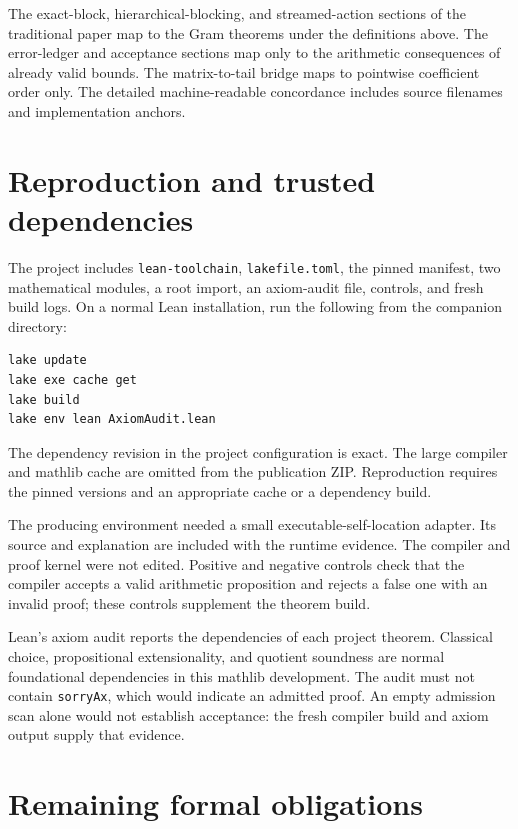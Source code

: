 \documentclass[11pt]{article}
\newcommand{\decl}[1]{\nolinkurl{#1}}
\begin{document}
The exact-block, hierarchical-blocking, and streamed-action sections of the
traditional paper map to the Gram theorems under the definitions above. The
error-ledger and acceptance sections map only to the arithmetic consequences
of already valid bounds. The matrix-to-tail bridge maps to pointwise
coefficient order only. The detailed machine-readable concordance includes
source filenames and implementation anchors.

\section{Reproduction and trusted dependencies}

The project includes \decl{lean-toolchain}, \decl{lakefile.toml}, the pinned
manifest, two mathematical modules, a root import, an axiom-audit file,
controls, and fresh build logs. On a normal Lean installation, run the
following from the companion directory:
\begin{verbatim}
lake update
lake exe cache get
lake build
lake env lean AxiomAudit.lean
\end{verbatim}
The dependency revision in the project configuration is exact. The large
compiler and mathlib cache are omitted from the publication ZIP. Reproduction
requires the pinned versions and an appropriate cache or a dependency build.

The producing environment needed a small executable-self-location adapter.
Its source and explanation are included with the runtime evidence. The
compiler and proof kernel were not edited. Positive and negative controls
check that the compiler accepts a valid arithmetic proposition and rejects a
false one with an invalid proof; these controls supplement the theorem build.

Lean's axiom audit reports the dependencies of each project theorem. Classical
choice, propositional extensionality, and quotient soundness are normal
foundational dependencies in this mathlib development. The audit must not
contain \decl{sorryAx}, which would indicate an admitted proof. An empty
admission scan alone would not establish acceptance: the fresh compiler build
and axiom output supply that evidence.

\section{Remaining formal obligations}
\end{document}
